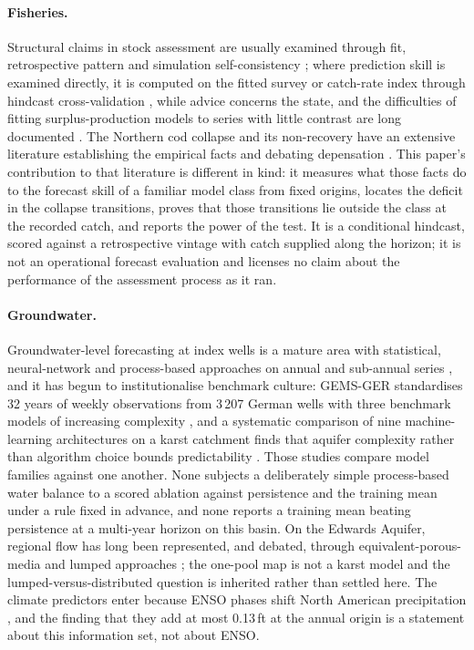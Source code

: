 \paragraph{Fisheries.} Structural claims in stock assessment are usually examined through fit, retrospective pattern and simulation self-consistency \citep{HilbornWalters1992,Punt2016,Maunder2015}; where prediction skill is examined directly, it is computed on the fitted survey or catch-rate index through hindcast cross-validation \citep{Kell2016,Kell2021,Carvalho2021,Kokkalis2024}, while advice concerns the state, and the difficulties of fitting surplus-production models to series with little contrast are long documented \citep{HilbornWalters1992,LudwigWalters1985,Polacheck1993,Punt2003,PedersenBerg2017}. The Northern cod collapse and its non-recovery have an extensive literature establishing the empirical facts \citep{Hutchings1994,Myers1997,Walters1996,Hutchings2005,RoseRowe2015,RoseWalters2019,Rose2026} and debating depensation \citep{Shelton1999,Hutchings1996,Myers1995,Liermann1997}. This paper's contribution to that literature is different in kind: it measures what those facts do to the forecast skill of a familiar model class from fixed origins, locates the deficit in the collapse transitions, proves that those transitions lie outside the class at the recorded catch, and reports the power of the test. It is a conditional hindcast, scored against a retrospective vintage with catch supplied along the horizon; it is not an operational forecast evaluation and licenses no claim about the performance of the assessment process as it ran.

\paragraph{Groundwater.} Groundwater-level forecasting at index wells is a mature area with statistical, neural-network and process-based approaches on annual and sub-annual series \citep{Daliakopoulos2005,AdamowskiChan2011}, and it has begun to institutionalise benchmark culture: GEMS-GER standardises 32 years of weekly observations from 3\,207 German wells with three benchmark models of increasing complexity \citep{Ohmer2026}, and a systematic comparison of nine machine-learning architectures on a karst catchment finds that aquifer complexity rather than algorithm choice bounds predictability \citep{Zhu2026}. Those studies compare model families against one another. None subjects a deliberately simple process-based water balance to a scored ablation against persistence and the training mean under a rule fixed in advance, and none reports a training mean beating persistence at a multi-year horizon on this basin. On the Edwards Aquifer, regional flow has long been represented, and debated, through equivalent-porous-media and lumped approaches \citep{Scanlon2003}; the one-pool map is not a karst model and the lumped-versus-distributed question is inherited rather than settled here. The climate predictors enter because ENSO phases shift North American precipitation \citep{Ropelewski1986}, and the finding that they add at most 0.13\,ft at the annual origin is a statement about this information set, not about ENSO.

